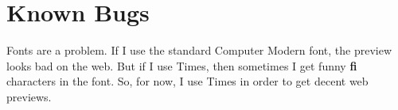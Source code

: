 \section{Known Bugs}

\be
\item Fonts are a problem. If I use the standard Computer Modern
font, the preview looks bad on the web. But if I use Times, then
sometimes I get funny {\bf fi} characters in the font. So, for now, I
use Times in order to get decent web previews.
\ee
